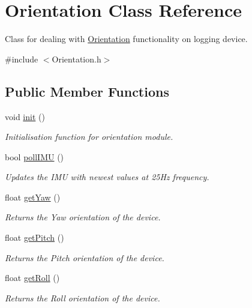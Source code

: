 \hypertarget{class_orientation}{}\section{Orientation Class Reference}
\label{class_orientation}


Class for dealing with \hyperlink{class_orientation}{Orientation} functionality on logging device.  




{\ttfamily \#include $<$Orientation.\+h$>$}

\subsection*{Public Member Functions}
\begin{DoxyCompactItemize}
\item 
void \hyperlink{class_orientation_a317461c5c8afa8c3abf56847d4544728}{init} ()
\begin{DoxyCompactList}\small\item\em Initialisation function for orientation module. \end{DoxyCompactList}\item 
bool \hyperlink{class_orientation_aad568a473f999c181abac46a4d832387}{poll\+I\+MU} ()
\begin{DoxyCompactList}\small\item\em Updates the I\+MU with newest values at 25\+Hz frequency. \end{DoxyCompactList}\item 
float \hyperlink{class_orientation_a3dbaa1ee014811c40d5b9f39b544c19b}{get\+Yaw} ()
\begin{DoxyCompactList}\small\item\em Returns the Yaw orientation of the device. \end{DoxyCompactList}\item 
float \hyperlink{class_orientation_a7ec1a2964fc858bbd5da22a505b087c8}{get\+Pitch} ()
\begin{DoxyCompactList}\small\item\em Returns the Pitch orientation of the device. \end{DoxyCompactList}\item 
float \hyperlink{class_orientation_ab8923432cb8c18822b0a9ae95a5ac505}{get\+Roll} ()
\begin{DoxyCompactList}\small\item\em Returns the Roll orientation of the device. \end{DoxyCompactList}\end{DoxyCompactItemize}
